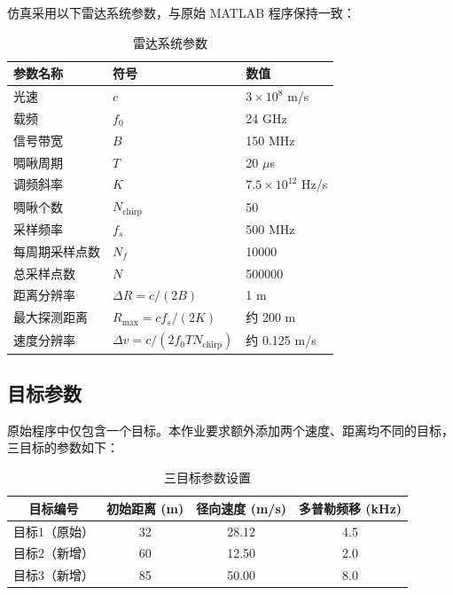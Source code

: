 \documentclass[12pt,a4paper]{ctexart}
\begin{document}
仿真采用以下雷达系统参数，与原始 MATLAB 程序保持一致：

\begin{table}[H]
\centering
\caption{雷达系统参数}
\begin{tabular}{lll}
\toprule
\textbf{参数名称} & \textbf{符号} & \textbf{数值} \\
\midrule
光速           & $c$      & $3 \times 10^8$ m/s \\
载频           & $f_0$    & 24 GHz \\
信号带宽       & $B$      & 150 MHz \\
啁啾周期       & $T$      & 20 $\mu$s \\
调频斜率       & $K$      & $7.5 \times 10^{12}$ Hz/s \\
啁啾个数       & $N_{\text{chirp}}$ & 50 \\
采样频率       & $f_s$    & 500 MHz \\
每周期采样点数 & $N_f$    & 10000 \\
总采样点数     & $N$      & 500000 \\
\midrule
距离分辨率     & $\Delta R = c/(2B)$      & 1 m \\
最大探测距离   & $R_{\max} = c f_s/(2K)$   & 约 200 m \\
速度分辨率     & $\Delta v = c/(2 f_0 T N_{\text{chirp}})$ & 约 0.125 m/s \\
\bottomrule
\end{tabular}
\end{table}

\subsection{目标参数}

原始程序中仅包含一个目标。本作业要求额外添加两个速度、距离均不同的目标，三目标的参数如下：

\begin{table}[H]
\centering
\caption{三目标参数设置}
\begin{tabular}{cccc}
\toprule
\textbf{目标编号} & \textbf{初始距离 (m)} & \textbf{径向速度 (m/s)} & \textbf{多普勒频移 (kHz)} \\
\midrule
目标1（原始） & 32  & 28.12 & 4.5  \\
目标2（新增） & 60  & 12.50 & 2.0  \\
目标3（新增） & 85  & 50.00 & 8.0  \\
\bottomrule
\end{tabular}
\end{table}
\end{document}
